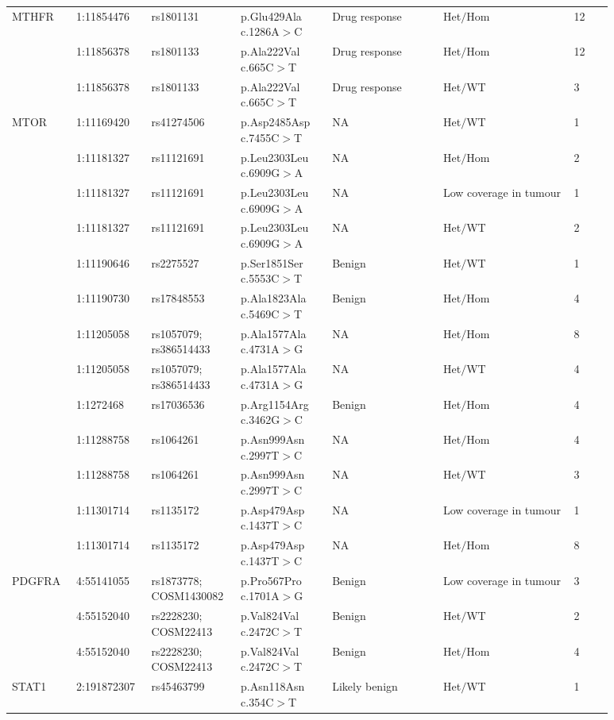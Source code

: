 \begin{landscape}
\begin{longtable}{p{0.09\linewidth}|p{0.1\linewidth}p{0.12\linewidth}p{0.14\linewidth}p{0.17\linewidth}p{0.2\linewidth}p{0.06\linewidth}}
		\hline
		MTHFR & 1:11854476 & rs1801131 & p.Glu429Ala c.1286A$>$C & Drug response & Het$/$Hom & 12
		\\
		& 1:11856378 & rs1801133 & p.Ala222Val c.665C$>$T & Drug response & Het$/$Hom & 12
		\\
		& 1:11856378 & rs1801133 & p.Ala222Val c.665C$>$T & Drug response & Het$/$WT & 3
		\\
		\hline
		MTOR & 1:11169420 & rs41274506 & p.Asp2485Asp c.7455C$>$T & NA & Het$/$WT & 1
		\\
		& 1:11181327 & rs11121691 & p.Leu2303Leu c.6909G$>$A & NA & Het$/$Hom & 2
		\\
		& 1:11181327 & rs11121691 & p.Leu2303Leu c.6909G$>$A & NA & Low coverage in tumour & 1
		\\
		& 1:11181327 & rs11121691 & p.Leu2303Leu c.6909G$>$A & NA & Het$/$WT & 2
		\\
		& 1:11190646 & rs2275527 & p.Ser1851Ser c.5553C$>$T & Benign & Het$/$WT & 1
		\\
		& 1:11190730 & rs17848553 & p.Ala1823Ala c.5469C$>$T & Benign & Het$/$Hom & 4
		\\
		& 1:11205058 & rs1057079; rs386514433 & p.Ala1577Ala c.4731A$>$G & NA & Het$/$Hom & 8
		\\
		& 1:11205058 & rs1057079; rs386514433 & p.Ala1577Ala c.4731A$>$G & NA & Het$/$WT & 4
		\\
		& 1:1272468 & rs17036536 & p.Arg1154Arg c.3462G$>$C & Benign & Het$/$Hom & 4
		\\
		& 1:11288758 & rs1064261 & p.Asn999Asn c.2997T$>$C & NA & Het$/$Hom & 4
		\\
		& 1:11288758 & rs1064261 & p.Asn999Asn c.2997T$>$C & NA & Het$/$WT & 3
		\\
		& 1:11301714 & rs1135172 & p.Asp479Asp c.1437T$>$C & NA & Low coverage in tumour & 1
		\\
		& 1:11301714 & rs1135172 & p.Asp479Asp c.1437T$>$C & NA & Het$/$Hom & 8
		\\
		\hline
		PDGFRA & 4:55141055 & rs1873778; COSM1430082 & p.Pro567Pro c.1701A$>$G & Benign & Low coverage in tumour & 3
		\\
		& 4:55152040 & rs2228230; COSM22413 & p.Val824Val c.2472C$>$T & Benign & Het$/$WT & 2
		\\
		& 4:55152040 & rs2228230; COSM22413 & p.Val824Val c.2472C$>$T & Benign & Het$/$Hom & 4
		\\
		\hline
		STAT1 & 2:191872307 & rs45463799 & p.Asn118Asn c.354C$>$T & Likely benign & Het$/$WT & 1
		\\

\end{longtable}
\end{landscape}
